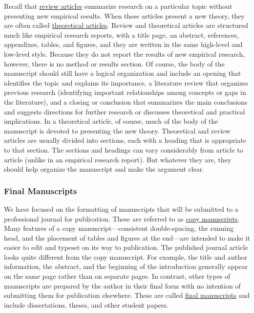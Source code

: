 \documentclass[
]{krantz}
\begin{document}
Recall that \protect\hyperlink{review-article}{review articles} summarize research on a particular topic without presenting new empirical results. When these articles present a new theory, they are often called \protect\hyperlink{theoretical-article}{theoretical articles}. Review and theoretical articles are structured much like empirical research reports, with a title page, an abstract, references, appendixes, tables, and figures, and they are written in the same high-level and low-level style. Because they do not report the results of new empirical research, however, there is no method or results section. Of course, the body of the manuscript should still have a logical organization and include an opening that identifies the topic and explains its importance, a literature review that organizes previous research (identifying important relationships among concepts or gaps in the literature), and a closing or conclusion that summarizes the main conclusions and suggests directions for further research or discusses theoretical and practical implications. In a theoretical article, of course, much of the body of the manuscript is devoted to presenting the new theory. Theoretical and review articles are usually divided into sections, each with a heading that is appropriate to that section. The sections and headings can vary considerably from article to article (unlike in an empirical research report). But whatever they are, they should help organize the manuscript and make the argument clear.

\hypertarget{final-manuscripts}{%
\subsubsection*{Final Manuscripts}\label{final-manuscripts}}


We have focused on the formatting of manuscripts that will be submitted to a professional journal for publication. These are referred to as \protect\hyperlink{copy-manuscript}{copy manuscripts}. Many features of a copy manuscript---consistent double-spacing, the running head, and the placement of tables and figures at the end---are intended to make it easier to edit and typeset on its way to publication. The published journal article looks quite different from the copy manuscript. For example, the title and author information, the abstract, and the beginning of the introduction generally appear on the same page rather than on separate pages. In contrast, other types of manuscripts are prepared by the author in their final form with no intention of submitting them for publication elsewhere. These are called \protect\hyperlink{final-manuscript}{final manuscripts} and include dissertations, theses, and other student papers.
\end{document}

